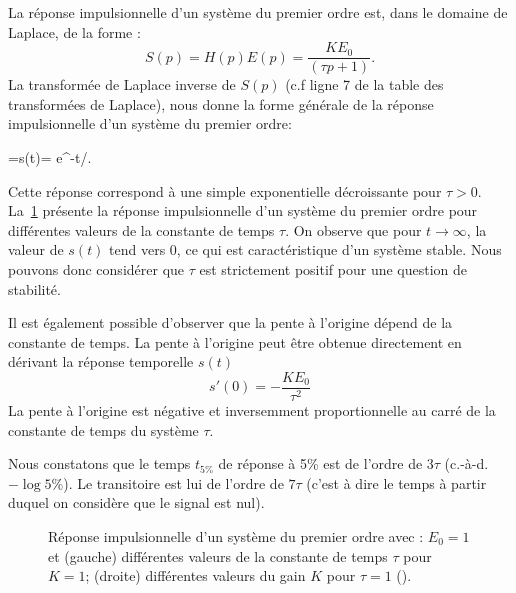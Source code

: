 La réponse impulsionnelle d'un système du premier ordre est, dans le 
domaine de Laplace, de la forme :
\[
S(p)=H(p)E(p)=\dfrac{KE_0}{(\tau p+1)}.
\]
La transformée de Laplace inverse de $S(p)$ (c.f ligne 7 de la table des
transformées de Laplace), nous donne la forme générale de la réponse 
impulsionnelle d'un système du premier ordre:
\begin{bequation}
    =s(t)= e^{-t/\tau}\label{eq-1er_imp}.
\end{bequation}
Cette réponse correspond à une simple exponentielle décroissante pour $\tau>0$.
La~\cref{fig-1er_imp} présente la réponse impulsionnelle d'un système 
du premier ordre pour différentes valeurs de la constante de temps $\tau$.
On observe que pour $t\to\infty$, la valeur de $s(t)$ tend vers 0, ce qui 
est caractéristique d'un système stable. Nous pouvons donc considérer que 
$\tau$ est strictement positif pour une question de stabilité.  

Il est également possible d'observer que la pente à l'origine dépend de la 
constante de temps. La pente à l'origine peut être obtenue directement en 
dérivant la réponse temporelle $s(t)$ 
\[
s'(0)=-\dfrac{KE_0}{\tau^2}
\]      
La pente à l'origine est négative et inversemment proportionnelle 
au carré de la constante de temps du système $\tau$.

Nous constatons que le temps $t_{5\%}$ de 
réponse à 5\% est de l'ordre de 3$\tau$ (c.-à-d. $-\log{5\%}$). Le transitoire 
est lui de l'ordre de $7\tau$ (c'est à dire le temps à partir duquel on 
considère que le signal est nul).
\begin{figure}[!hb]
    \centering
    
    \hfill
    
    \caption{Réponse impulsionnelle d'un système du premier ordre avec : 
             $E_0=1$ et (gauche) différentes valeurs de la constante 
             de temps $\tau$ pour $K=1$; (droite) différentes valeurs 
             du gain $K$ pour $\tau=1$ (). 
             \label{fig-1er_imp}}
\end{figure}
\clearpage
\thispagestyle{empty}
